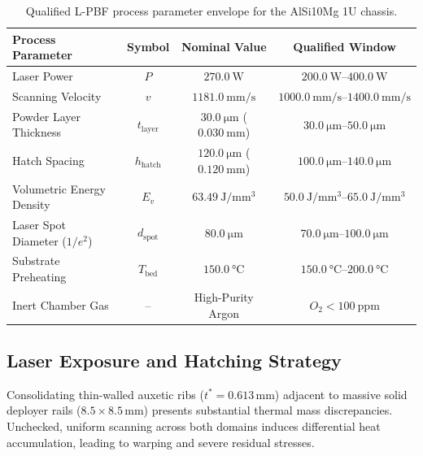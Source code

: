 \begin{table}[htbp]
\centering
\caption{Qualified L-PBF process parameter envelope for the AlSi10Mg 1U chassis.}
\label{tab:lpbf_parameters}
\begin{tabular}{lccc}
\toprule
\textbf{Process Parameter} & \textbf{Symbol} & \textbf{Nominal Value} & \textbf{Qualified Window} \\
\midrule
Laser Power & $P$ & $\SI{270.0}{\watt}$ & $\SI{200.0}{\watt}\text{--}\SI{400.0}{\watt}$ \\
Scanning Velocity & $v$ & $\SI{1181.0}{\milli\meter/\second}$ & $\SI{1000.0}{\milli\meter/\second}\text{--}\SI{1400.0}{\milli\meter/\second}$ \\
Powder Layer Thickness & $t_{\text{layer}}$ & $\SI{30.0}{\micro\meter}$ ($\SI{0.030}{\milli\meter}$) & $\SI{30.0}{\micro\meter}\text{--}\SI{50.0}{\micro\meter}$ \\
Hatch Spacing & $h_{\text{hatch}}$ & $\SI{120.0}{\micro\meter}$ ($\SI{0.120}{\milli\meter}$) & $\SI{100.0}{\micro\meter}\text{--}\SI{140.0}{\micro\meter}$ \\
Volumetric Energy Density & $E_v$ & $\SI{63.49}{\joule/\milli\meter^3}$ & $\SI{50.0}{\joule/\milli\meter^3}\text{--}\SI{65.0}{\joule/\milli\meter^3}$ \\
Laser Spot Diameter ($1/e^2$) & $d_{\text{spot}}$ & $\SI{80.0}{\micro\meter}$ & $\SI{70.0}{\micro\meter}\text{--}\SI{100.0}{\micro\meter}$ \\
Substrate Preheating & $T_{\text{bed}}$ & $\SI{150.0}{\celsius}$ & $\SI{150.0}{\celsius}\text{--}\SI{200.0}{\celsius}$ \\
Inert Chamber Gas & -- & High-Purity Argon & $O_2 < \SI{100}{\text{ppm}}$ \\
\bottomrule
\end{tabular}
\end{table}

\subsection{Laser Exposure and Hatching Strategy}
Consolidating thin-walled auxetic ribs ($t^* = 0.613\,\text{mm}$) adjacent to massive solid deployer rails ($8.5 \times 8.5\,\text{mm}$) presents substantial thermal mass discrepancies. Unchecked, uniform scanning across both domains induces differential heat accumulation, leading to warping and severe residual stresses.

